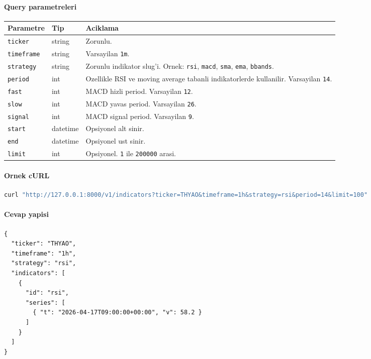 \documentclass[11pt,a4paper]{article}
\begin{document}
\paragraph{Query parametreleri}
\begin{longtable}{>{\raggedright\arraybackslash}p{3cm} >{\raggedright\arraybackslash}p{2.2cm} >{\raggedright\arraybackslash}p{8.2cm}}
\toprule
Parametre & Tip & Aciklama \\
\midrule
\endhead
\texttt{ticker} & string & Zorunlu. \\
\texttt{timeframe} & string & Varsayilan \texttt{1m}. \\
\texttt{strategy} & string & Zorunlu indikator slug'i. Ornek: \texttt{rsi}, \texttt{macd}, \texttt{sma}, \texttt{ema}, \texttt{bbands}. \\
\texttt{period} & int & Ozellikle RSI ve moving average tabanli indikatorlerde kullanilir. Varsayilan \texttt{14}. \\
\texttt{fast} & int & MACD hizli period. Varsayilan \texttt{12}. \\
\texttt{slow} & int & MACD yavas period. Varsayilan \texttt{26}. \\
\texttt{signal} & int & MACD signal period. Varsayilan \texttt{9}. \\
\texttt{start} & datetime & Opsiyonel alt sinir. \\
\texttt{end} & datetime & Opsiyonel ust sinir. \\
\texttt{limit} & int & Opsiyonel. \texttt{1} ile \texttt{200000} arasi. \\
\bottomrule
\end{longtable}

\paragraph{Ornek cURL}
\begin{lstlisting}[language=bash]
curl "http://127.0.0.1:8000/v1/indicators?ticker=THYAO&timeframe=1h&strategy=rsi&period=14&limit=100"
\end{lstlisting}

\paragraph{Cevap yapisi}
\begin{lstlisting}
{
  "ticker": "THYAO",
  "timeframe": "1h",
  "strategy": "rsi",
  "indicators": [
    {
      "id": "rsi",
      "series": [
        { "t": "2026-04-17T09:00:00+00:00", "v": 58.2 }
      ]
    }
  ]
}
\end{lstlisting}
\end{document}
